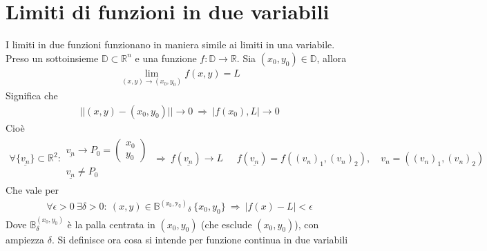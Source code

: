 \documentclass[a4paper, oneside]{book}
\begin{document}
\section{Limiti di funzioni in due variabili}
I limiti in due funzioni funzionano in maniera simile ai limiti in una variabile. 
Preso un sottoinsieme $\mathbb{D} \subset \mathbb{R}^{n}$ e una funzione $f : \mathbb{D} \to \mathbb{R}$. 
Sia $(x_0, y_0) \in \mathbb{D}$, allora 
\begin{align}
    \lim_{(x, y) \to (x_0, y_0)}f(x, y) = L  
\end{align}
Significa che
\begin{gather*}
    ||(x, y) - (x_0, y_0)|| \to 0 \ \Longrightarrow \  |f(x_0), L | \to 0
\end{gather*}
Cioè
\begin{gather*}
    \forall \{ \underline{v_n}\} \subset \mathbb{R}^{2} :
    \begin{array}{l}
        \underline{v_n} \to P_0 = \begin{pmatrix} x_0 \\
        y_0 \end{pmatrix}  \\
         \underline{v_n} \neq P_0
    \end{array} \ \Longrightarrow \ f(\underline{v_n}) \to L  \quad 
    \begin{array}{l}
        f( \underline{v_n}) = f((v_n)_1, (v_n)_2), \quad v_n = ((v_n)_1, (v_n)_2)
    \end{array}
\end{gather*} 
Che vale per
\begin{gather*}
    \forall \epsilon > 0 \ \exists \delta > 0 : \ (x, y) \in \mathbb{B ^{(x_0, y_0)}}_{\delta}\ \{x_0, y_0\}  \ \Longrightarrow \ \left| f(x)  - L \right| < \epsilon 
\end{gather*}
Dove $\mathbb{B}_\delta^{(x_0, y_0)}$ è la palla centrata in $(x_0, y_0)$ (che esclude $(x_0, y_0)$), con 
ampiezza $\delta$. Si definisce ora cosa si intende per funzione continua in due variabili
\end{document}
